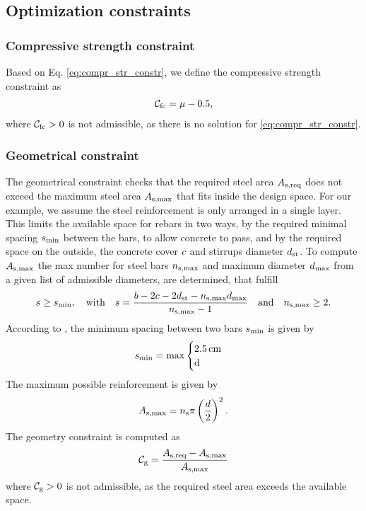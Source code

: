 \subsection{Optimization constraints}
\subsubsection{Compressive strength constraint}
Based on Eq. \ref{eq:compr_str_constr}, we define the compressive strength constraint as
\begin{align}
	\mathcal{C}_{\text{fc}} = \mu - 0.5, 
\end{align}
where $\mathcal{C}_{\text{fc}} > 0$ is not admissible, as there is no solution for \ref{eq:compr_str_constr}.
\subsubsection{Geometrical constraint}
The geometrical constraint checks that the required steel area $A_{\text{s,req}}$ does not exceed the maximum steel area $A_{\text{s,max}}$ that fits inside the design space.
For our example, we assume the steel reinforcement is only arranged in a single layer.
This limits the available space for rebars in two ways, by the required minimal spacing $s_{\text{min}}$ between the bars, to allow concrete to pass, and by the required space on the outside, the concrete cover $c$ and stirrups diameter $d_{\text{st}}$.
To compute $A_{\text{s,max}}$ the max number for steel bars $n_{\text{s,max}}$ and maximum diameter $d_{\text{max}}$ from a given list of admissible diameters, are determined, that fulfill
\begin{equation}
	s \ge s_{\text{min}},\quad\text{with}\quad s = \frac{b - 2 c - 2 d_{\text{st}} - n_{\text{s,max}} d_{\text{max}}}{n_{\text{s,max}} - 1} \quad\text{and}\quad n_{\text{s,max}} \ge 2.
\end{equation}
According to \citeauthor{DIN1992-1-1}, the minimum spacing between two bars $s_{\text{min}}$ is given by
\begin{equation}
	\beamMinSpacing = \max
	\begin{cases}
		\inputconcretecover \,\text{\inputconcretecoverunit}\\
		$\beamSteelDiameter$
	\end{cases}       
\end{equation}
The maximum possible reinforcement is given by
\begin{equation}
	A_{\text{s,max}} = n_{\text{s}} \pi \left( \frac{d}{2}\right)^{2}.
\end{equation}
The geometry constraint is computed as
\begin{equation}
	\mathcal{C}_{\text{g}} = \frac{A_{\text{s,req}} - A_{\text{s,max}}}{A_{\text{s,max}}}
\end{equation}
where $\mathcal{C}_{\text{g}} > 0$ is not admissible, as the required steel area exceeds the available space.
